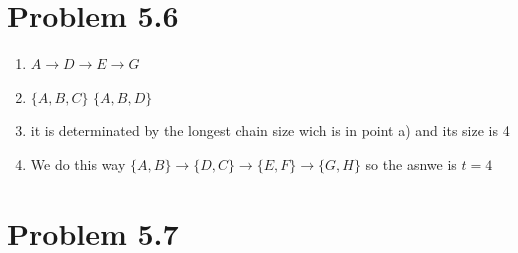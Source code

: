 \documentclass[12pt]{article}
\begin{document}
\section*{Problem 5.6}
\begin{enumerate}[label=\alph*)]
    \item $A\rightarrow D \rightarrow E \rightarrow G$
    \item $\{A, B, C\}$ $\{A, B, D\}$
    \item it is determinated by the longest chain size wich is in point a) and its size is 4
    \item We do this way $\{A, B\} \rightarrow \{D, C\} \rightarrow \{E, F\} \rightarrow \{G, H\}$ so the asnwe is $t=4$
\end{enumerate}

\section*{Problem 5.7}
\end{document}
